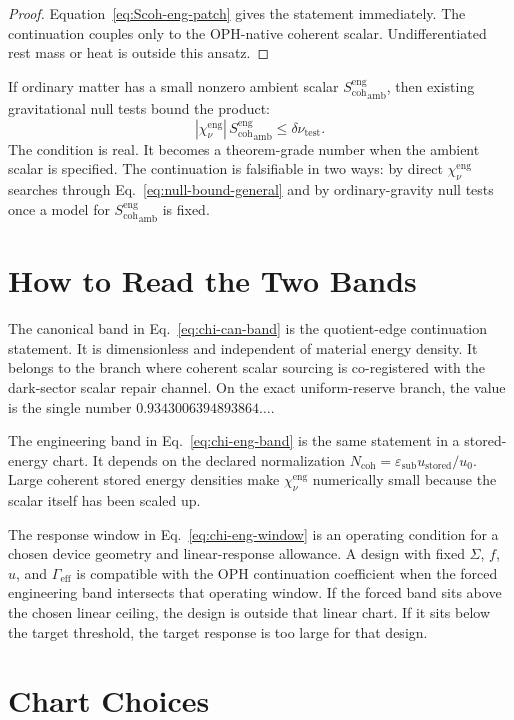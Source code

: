 \documentclass[11pt]{article}
\numberwithin{equation}{section}
\theoremstyle{remark}
\newcommand{\chieng}{\chi_\nu^{\mathrm{eng}}}
\newcommand{\scoheng}{S_{\mathrm{coh}}^{\mathrm{eng}}}
\newcommand{\Ncoh}{N_{\mathrm{coh}}}
\newcommand{\eps}{\varepsilon}
\newcommand{\Gammaeff}{\Gamma_{\mathrm{eff}}}
\begin{document}
\begin{proof}
Equation~\eqref{eq:Scoh-eng-patch} gives the statement immediately. The
continuation couples only to the OPH-native coherent scalar. Undifferentiated
rest mass or heat is outside this ansatz.
\end{proof}

If ordinary matter has a small nonzero ambient scalar
\({\scoheng}_{\mathrm{amb}}\), then existing gravitational null tests bound the
product:
\begin{equation}
|\chieng|\,{\scoheng}_{\mathrm{amb}}
\le
\delta\nu_{\mathrm{test}}.
\label{eq:ambient-bound}
\end{equation}
The condition is real. It becomes a theorem-grade number when the ambient scalar
is specified. The continuation is falsifiable in
two ways: by direct \(\chieng\) searches through Eq.~\eqref{eq:null-bound-general}
and by ordinary-gravity null tests once a model for \({\scoheng}_{\mathrm{amb}}\) is
fixed.

\section{How to Read the Two Bands}

The canonical band in Eq.~\eqref{eq:chi-can-band} is the quotient-edge
continuation statement. It is dimensionless and independent of material energy
density. It belongs to the branch where coherent scalar sourcing is
co-registered with the dark-sector scalar repair channel. On the exact
uniform-reserve branch, the value is the single number
\(0.9343006394893864\ldots\).

The engineering band in Eq.~\eqref{eq:chi-eng-band} is the same statement in a
stored-energy chart. It depends on the declared normalization
\(\Ncoh=\eps_{\mathrm{sub}}u_{\mathrm{stored}}/u_0\). Large coherent stored
energy densities make \(\chieng\) numerically small because the scalar itself
has been scaled up.

The response window in Eq.~\eqref{eq:chi-eng-window} is an operating condition
for a chosen device geometry and linear-response allowance. A design with
fixed \(\Sigma\), \(f\), \(u\), and \(\Gammaeff\) is compatible with the OPH
continuation coefficient when the forced engineering band intersects that
operating window.
If the forced band sits above the chosen linear ceiling, the design is outside
that linear chart. If it sits below the target threshold, the target response is
too large for that design.

\section{Chart Choices}
\end{document}
